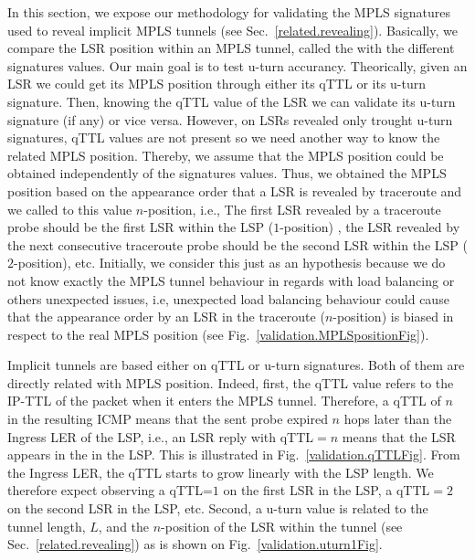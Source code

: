 In this section, we expose our methodology for validating the MPLS
signatures used to reveal implicit MPLS tunnels (see Sec.~\ref{related.revealing}).
Basically, we compare the LSR position within an MPLS tunnel, called the
 with the different signatures values. Our main goal is to test 
u-turn accurancy. Theorically, given an LSR we could get its MPLS position through 
either its qTTL or its u-turn signature. Then, knowing the qTTL value of the LSR we 
can validate its u-turn signature (if any) or vice versa. However, on LSRs revealed 
only trought u-turn signatures,
qTTL values are not present so we need another way to know the related MPLS position. 
Thereby, we assume that the MPLS position
could be obtained independently of the signatures values. 
Thus, we obtained the MPLS position based on the appearance order that a LSR is 
revealed by traceroute and we called to this value $n$-position, i.e., 
The first LSR revealed by a traceroute probe should be
the first LSR within the LSP ($1$-position) , the LSR revealed by the next 
consecutive traceroute probe should be
the second LSR within the LSP ($2$-position), etc. Initially, we consider 
this just as an hypothesis because we do not know 
exactly the MPLS tunnel behaviour in regards with load balancing or others 
unexpected issues, i.e, unexpected load balancing behaviour could cause 
that the appearance order by an LSR in the traceroute ($n$-position) 
is biased in respect to the real MPLS position (see Fig.~\ref{validation.MPLSpositionFig}).

Implicit tunnels are based either on qTTL or u-turn signatures. Both of them are
directly related with MPLS position.  Indeed, first, the qTTL value refers to
the IP-TTL of the \echorequest packet when it enters the MPLS tunnel. 
Therefore, a qTTL of $n$ in the resulting ICMP \ttlexceeded means that the sent
probe expired $n$ hops later than the Ingress LER of the LSP, i.e., an LSR reply
with qTTL$=n$ means that the LSR appears in the  in the LSP. 
This is illustrated in Fig.~\ref{validation.qTTLFig}.  From the Ingress LER, the
qTTL starts to grow linearly with the LSP length.  We therefore expect observing
a qTTL=$1$ on the first LSR in the LSP, a qTTL$=2$ on the second LSR in the LSP,
etc.  Second, a u-turn value is related to the tunnel length, $L$, and the
$n$-position of the LSR within the tunnel (see Sec.~\ref{related.revealing}) as is shown on Fig.~\ref{validation.uturn1Fig}.

